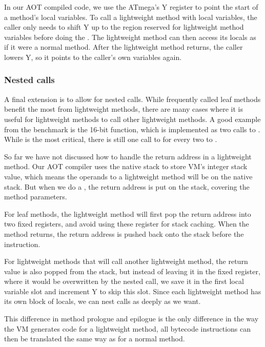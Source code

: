 In our AOT compiled code, we use the ATmega's Y register to point the start of a method's local variables. To call a lightweight method with local variables, the caller only needs to shift Y up to the region reserved for lightweight method variables before doing the . The lightweight method can then access its locals as if it were a normal method. After the lightweight method returns, the caller lowers Y, so it points to the caller's own variables again.

\subsubsection{Nested calls}
A final extension is to allow for nested calls. While frequently called leaf methods benefit the most from lightweight methods, there are many cases where it is useful for lightweight methods to call other lightweight methods. A good example from the  benchmark is the 16-bit  function, which is implemented as two calls to . While  is the most critical, there is still one call to  for every two to .

So far we have not discussed how to handle the return address in a lightweight method. Our AOT compiler uses the native stack to store VM's integer stack value, which means the operands to a lightweight method will be on the native stack. But when we do a , the return address is put on the stack, covering the method parameters.

For leaf methods, the lightweight method will first pop the return address into two fixed registers, and avoid using these register for stack caching. When the method returns, the return address is pushed back onto the stack before the  instruction.

For lightweight methods that will call another lightweight method, the return value is also popped from the stack, but instead of leaving it in the fixed register, where it would be overwritten by the nested call, we save it in the first local variable slot and increment Y to skip this slot. Since each lightweight method has its own block of locals, we can nest calls as deeply as we want.

This difference in method prologue and epilogue is the only difference in the way the VM generates code for a lightweight method, all bytecode instructions can then be translated the same way as for a normal method.

